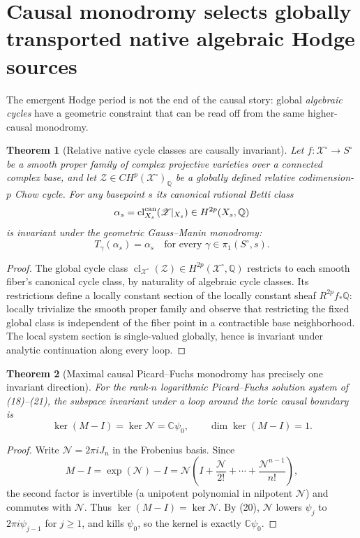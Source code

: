 \documentclass[11pt]{article}
\newtheorem{theorem}{Theorem}
\begin{document}
\section{Causal monodromy selects globally transported native algebraic Hodge sources}

The emergent Hodge period is not the end of the causal story:
global \emph{algebraic cycles} have a geometric constraint that
can be read off from the same higher-causal monodromy.

\begin{theorem}[Relative native cycle classes are causally invariant]
Let $f:\mathscr X^\circ\to S^\circ$ be a smooth proper family
of complex projective varieties over a connected complex base,
and let $\mathscr Z\in CH^p(\mathscr X^\circ)_{\mathbb Q}$
be a globally defined relative codimension-$p$ Chow cycle.
For any basepoint $s$ its canonical rational Betti class
\[
 \alpha_s=\operatorname{cl}_{X_s}^{\rm can}
   (\mathscr Z|_{X_s})\in H^{2p}(X_s,\mathbb Q)
\]
is invariant under the geometric Gauss--Manin monodromy:
\[
 \boxed{\quad T_\gamma(\alpha_s)=\alpha_s
   \quad\text{for every }\gamma\in\pi_1(S^\circ,s).\quad}
 \tag{23}
\]
\end{theorem}
\begin{proof}
The global cycle class $\operatorname{cl}_{\mathscr X^\circ}
(\mathscr Z)\in H^{2p}(\mathscr X^\circ,\mathbb Q)$
restricts to each smooth fiber's canonical cycle
class, by naturality of algebraic cycle classes.
Its restrictions define a locally constant section
of the locally constant sheaf $R^{2p}f_*\mathbb Q$:
locally trivialize the smooth proper family and
observe that restricting the fixed global class
is independent of the fiber point in a contractible
base neighborhood. The local system section is
single-valued globally, hence is invariant under
analytic continuation along every loop.
\end{proof}

\begin{theorem}[Maximal causal Picard--Fuchs monodromy has precisely one
invariant direction]
For the rank-$n$ logarithmic Picard--Fuchs solution system
of (18)--(21), the subspace invariant under a loop around
the toric causal boundary is
\[
 \boxed{\quad\ker(M-I)=\ker\mathcal N
   =\mathbb C\psi_0,\qquad\dim\ker(M-I)=1.\quad}
 \tag{24}
\]
\end{theorem}
\begin{proof}
Write $\mathcal N=2\pi iJ_n$ in the Frobenius
basis. Since
\[
 M-I=\exp(\mathcal N)-I
   =\mathcal N\left(I+\frac{\mathcal N}{2!}
         +\cdots+\frac{\mathcal N^{n-1}}{n!}\right),
\]
the second factor is invertible (a unipotent
polynomial in nilpotent $\mathcal N$) and
commutes with $\mathcal N$. Thus $\ker(M-I)
=\ker\mathcal N$. By (20), $\mathcal N$ lowers
$\psi_j$ to $2\pi i\psi_{j-1}$ for $j\ge1$,
and kills $\psi_0$, so the kernel is
exactly $\mathbb C\psi_0$.
\end{proof}
\end{document}
